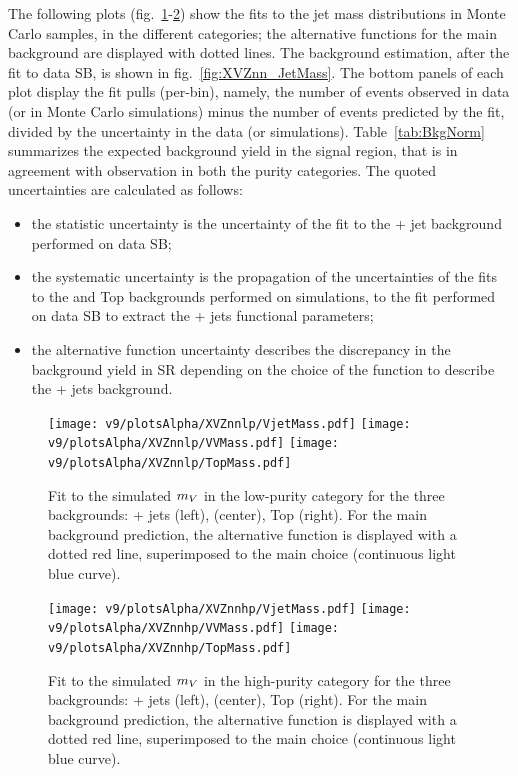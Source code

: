 \noindent The following plots (fig.~\ref{fig:XVZnnlp_JetMass}-\ref{fig:XVZnnhp_JetMass}) show the fits to the jet mass distributions in Monte Carlo samples, in the different categories; the alternative functions for the main background are displayed with dotted lines. The background estimation, after the fit to data SB, is shown in fig.~\ref{fig:XVZnn_JetMass}. The bottom panels of each plot display the fit pulls (per-bin), namely, the number of events observed in data (or in Monte Carlo simulations) minus the number of events predicted by the fit, divided by the uncertainty in the data (or simulations). Table~\ref{tab:BkgNorm} summarizes the expected background yield in the signal region, that is in agreement with observation in both the purity categories. The quoted uncertainties are calculated as follows:
\begin{itemize}
\item the statistic uncertainty is the uncertainty of the fit to the \V + jet background performed on data SB;
\item the systematic uncertainty is the propagation of the uncertainties of the fits to the \VV and Top backgrounds performed on simulations, to the fit performed on data SB to extract the \V + jets functional parameters;
\item the alternative function uncertainty describes the discrepancy in the background yield in SR depending on the choice of the function to describe the \V + jets background.
\end{itemize}







\begin{figure}[!htb]
  \centering
    \texttt{[image: v9/plotsAlpha/XVZnnlp/VjetMass.pdf]}
    \texttt{[image: v9/plotsAlpha/XVZnnlp/VVMass.pdf]}
    \texttt{[image: v9/plotsAlpha/XVZnnlp/TopMass.pdf]}
  \caption{Fit to the simulated $m_V$ in the low-purity category for the three backgrounds: \V + jets (left), \VV (center), Top (right). For the main background prediction, the alternative function is displayed with a dotted red line, superimposed to the main choice (continuous light blue curve).}
  \label{fig:XVZnnlp_JetMass}
\end{figure}


\begin{figure}[!htb]
  \centering
    \texttt{[image: v9/plotsAlpha/XVZnnhp/VjetMass.pdf]}
    \texttt{[image: v9/plotsAlpha/XVZnnhp/VVMass.pdf]}
    \texttt{[image: v9/plotsAlpha/XVZnnhp/TopMass.pdf]}
  \caption{Fit to the simulated $m_V$ in the high-purity category for the three backgrounds: \V + jets (left), \VV (center), Top (right). For the main background prediction, the alternative function is displayed with a dotted red line, superimposed to the main choice (continuous light blue curve).}
  \label{fig:XVZnnhp_JetMass}
\end{figure}


